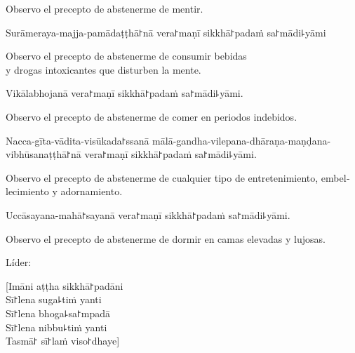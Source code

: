\begin{english}
  Observo el precepto de abstenerme de mentir.
\end{english}

\begin{precept}
  \setcounter{enumi}{4}
  \item Surāmeraya-majja-pamādaṭṭhā꜓nā vera꜓maṇī sikkhā꜓padaṁ sa꜓mādi꜕yāmi
\end{precept}

\begin{english}
  Observo el precepto de abstenerme de consumir bebidas\\
  y drogas intoxicantes que disturben la mente.
\end{english}

\begin{precept}
  \setcounter{enumi}{5}
  \item Vikālabhojanā vera꜓maṇī sikkhā꜓padaṁ sa꜓mādi꜕yāmi.
\end{precept}

\begin{english}
  Observo el precepto de abstenerme de comer en periodos indebidos.
\end{english}

\begin{precept}
  \setcounter{enumi}{6}
  \item Nacca-gīta-vādita-visūkada꜓ssanā mālā-gandha-vilepana-dhāraṇa-maṇḍana-vibhūsanaṭṭhā꜓nā vera꜓maṇī sikkhā꜓padaṁ sa꜓mādi꜕yāmi.
\end{precept}

\begin{english}
  Observo el precepto de abstenerme de cualquier tipo de entretenimiento, embellecimiento y adornamiento.
\end{english}

\begin{precept}
  \setcounter{enumi}{7}
  \item Uccāsayana-mahā꜓sayanā vera꜓maṇī sikkhā꜓padaṁ sa꜓mādi꜕yāmi.
\end{precept}

\begin{english}
  Observo el precepto de abstenerme de dormir en camas elevadas y lujosas.
\end{english}

\begin{instruction}
  Líder:
\end{instruction}

[Imāni aṭṭha sikkhā꜓padāni\\
Sī꜓lena suga꜕tiṁ yanti\\
Sī꜓lena bhoga꜕sa꜓mpadā\\
Sī꜓lena nibbu꜕tiṁ yanti\\
Tasmā꜓ sī꜓laṁ viso꜓dhaye]

